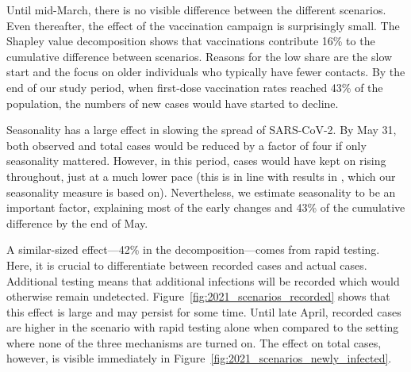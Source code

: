 \documentclass[12pt]{article}
\begin{document}
\begin{figure}[!tp]
\end{figure}

Until mid-March, there is no visible difference between the different scenarios. Even
thereafter, the effect of the vaccination campaign is surprisingly small. The Shapley
value decomposition shows that vaccinations contribute 16\% to the cumulative difference
between scenarios. Reasons for the low share are the slow start and the focus on older
individuals who typically have fewer contacts. By the end of our study period, when
first-dose vaccination rates reached 43\% of the population, the numbers of new cases
would have started to decline.

Seasonality has a large effect in slowing the spread of SARS-CoV-2. By May 31, both
observed and total cases would be reduced by a factor of four if only seasonality
mattered. However, in this period, cases would have kept on rising throughout, just at a
much lower pace (this is in line with results in \cite{Gavenciak2021}, which our
seasonality measure is based on). Nevertheless, we estimate seasonality to be an
important factor, explaining most of the early changes and 43\% of the cumulative
difference by the end of May.

A similar-sized effect---42\% in the decomposition---comes from rapid testing. Here, it
is crucial to differentiate between recorded cases and actual cases. Additional testing
means that additional infections will be recorded which would otherwise remain
undetected. Figure~\ref{fig:2021_scenarios_recorded} shows that this effect is large and
may persist for some time. Until late April, recorded cases are higher in the scenario
with rapid testing alone when compared to the setting where none of the three mechanisms
are turned on. The effect on total cases, however, is visible immediately in
Figure~\ref{fig:2021_scenarios_newly_infected}.
\end{document}
